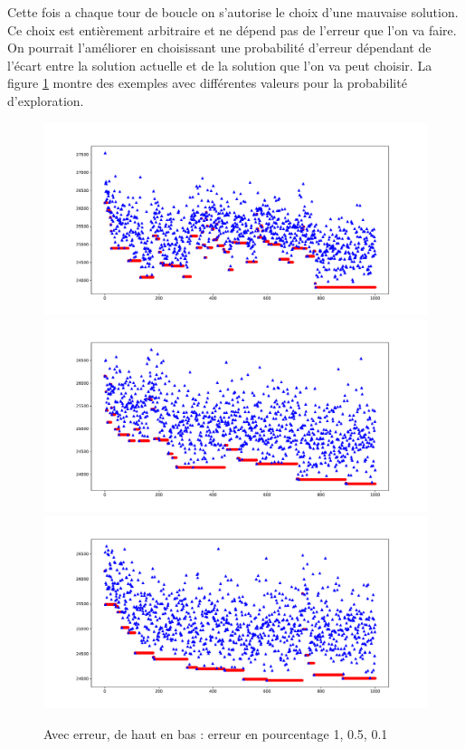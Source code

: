 \documentclass[10pt,a4paper]{article}
\begin{document}
Cette fois a chaque tour de boucle on s'autorise le choix d'une mauvaise solution. Ce choix est entièrement arbitraire et ne dépend pas de l'erreur que l'on va faire. On pourrait l'améliorer en choisissant une probabilité d'erreur dépendant de l'écart entre la solution actuelle  et de la solution que l'on va peut choisir. La figure \ref{compareerror} montre des exemples avec différentes valeurs pour la probabilité d'exploration.
\begin{figure}
\includegraphics[scale=.35]{images/with_error_01_1000}
\includegraphics[scale=.35]{images/with_error_005_1000}
\includegraphics[scale=.35]{images/with_error_001_1000}
\label{compareerror}
\caption{Avec erreur, de haut en bas : erreur en pourcentage 1, 0.5, 0.1}
\end{figure}
\end{document}
